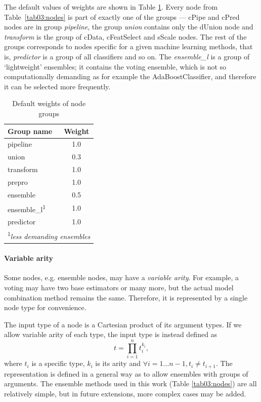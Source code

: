 The default values of weights are shown in Table \ref{tab03:weights}. Every node
from Table~\ref{tab03:nodes} is part of exactly one of the groups --- cPipe
and cPred nodes are in
group \emph{pipeline}, the group \emph{union} contains only the dUnion node and
\emph{transform} is the group of cData, cFeatSelect and sScale nodes. The rest of
the groups corresponds to nodes specific for a given machine learning methods, that
is, \emph{predictor} is a group of all classifiers and so on. The \emph{ensemble\_l}
is a group of `lightweight' ensembles; it contains the voting ensemble, which is
not so computationally demanding as for example the AdaBoostClassifier,
and therefore it can be selected more frequently.

\begin{table}[ht]

\centering
\caption{Default weights of node groups}\label{tab03:weights}
\begin{tabular}{l c}
\toprule
\textbf{Group name} & \textbf{Weight} \\
\midrule
pipeline   & 1.0 \\
union      & 0.3 \\
transform  & 1.0 \\
prepro     & 1.0 \\
ensemble   & 0.5 \\
ensemble\_l\textsuperscript{1} & 1.0 \\
predictor  & 1.0 \\
\bottomrule
\multicolumn{2}{l}{\footnotesize\textsuperscript{1}\itshape less demanding ensembles}
\end{tabular}

\end{table}

\paragraph{Variable arity}
Some nodes, e.g. ensemble nodes, may have a \emph{variable arity}.
For example, a voting may have two base estimators or many more, but the
actual model combination method remains the same. Therefore, it is represented by a
single node type for convenience.

The input type of a node is a Cartesian product of its argument types. If we allow
variable arity of each type, the input type is instead defined as
$$t = \prod_{i=1}^{n}t_i^{k_i},$$
where $t_i$ is a specific type, $k_i$ is its arity and $\forall i=1\ldots n - 1, t_i \neq t_{i+1}$.
The representation is defined in a general way as to allow ensembles with groups
of arguments. The ensemble methods used in this work (Table \ref{tab03:nodes})
are all relatively simple, but in future extensions, more complex cases may be added.

